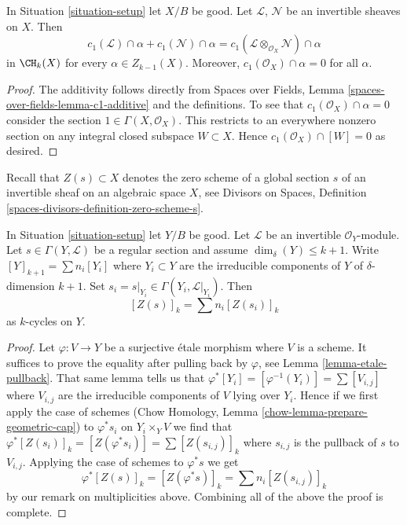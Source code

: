 \begin{lemma}
\label{lemma-c1-cap-additive}
In Situation \ref{situation-setup} let $X/B$ be good.
Let $\mathcal{L}$, $\mathcal{N}$ be an invertible sheaves on $X$.
Then
$$
c_1(\mathcal{L}) \cap \alpha  + c_1(\mathcal{N}) \cap \alpha =
c_1(\mathcal{L} \otimes_{\mathcal{O}_X} \mathcal{N}) \cap \alpha
$$
in $\CH_k(X)$ for every $\alpha \in Z_{k - 1}(X)$. Moreover,
$c_1(\mathcal{O}_X) \cap \alpha = 0$ for all $\alpha$.
\end{lemma}

\begin{proof}
The additivity follows directly from
Spaces over Fields, Lemma \ref{spaces-over-fields-lemma-c1-additive}
and the definitions. To see that $c_1(\mathcal{O}_X) \cap \alpha = 0$
consider the section $1 \in \Gamma(X, \mathcal{O}_X)$. This restricts
to an everywhere nonzero section on any integral closed subspace
$W \subset X$. Hence $c_1(\mathcal{O}_X) \cap [W] = 0$ as desired.
\end{proof}

\noindent
Recall that $Z(s) \subset X$ denotes the zero scheme of a global section
$s$ of an invertible sheaf on an algebraic space $X$, see
Divisors on Spaces, Definition \ref{spaces-divisors-definition-zero-scheme-s}.

\begin{lemma}
\label{lemma-prepare-geometric-cap}
In Situation \ref{situation-setup} let $Y/B$ be good.
Let $\mathcal{L}$ be an invertible $\mathcal{O}_Y$-module.
Let $s \in \Gamma(Y, \mathcal{L})$ be a regular section and
assume $\dim_\delta(Y) \leq k + 1$.
Write $[Y]_{k + 1} = \sum n_i[Y_i]$ where $Y_i \subset Y$ are the
irreducible components of $Y$ of $\delta$-dimension $k + 1$.
Set $s_i = s|_{Y_i} \in \Gamma(Y_i, \mathcal{L}|_{Y_i})$. Then
\begin{equation}
\label{equation-equal-as-cycles}
[Z(s)]_k =  \sum n_i[Z(s_i)]_k
\end{equation}
as $k$-cycles on $Y$.
\end{lemma}

\begin{proof}
Let $\varphi : V \to Y$ be a surjective \'etale morphism where $V$
is a scheme. It suffices to prove the equality after pulling back
by $\varphi$, see Lemma \ref{lemma-etale-pullback}.
That same lemma tells us that
$\varphi^*[Y_i] = [\varphi^{-1}(Y_i)] = \sum [V_{i, j}]$
where $V_{i, j}$ are the irreducible components of $V$ lying over $Y_i$.
Hence if we first apply the case of schemes
(Chow Homology, Lemma \ref{chow-lemma-prepare-geometric-cap}) to
$\varphi^*s_i$ on $Y_i \times_Y V$ we
find that $\varphi^*[Z(s_i)]_k = [Z(\varphi^*s_i)] =
\sum [Z(s_{i, j})]_k$ where $s_{i, j}$ is the pullback
of $s$ to $V_{i, j}$. Applying the case of schemes to $\varphi^*s$ we get
$$
\varphi^*[Z(s)]_k =
[Z(\varphi^*s)]_k =
\sum n_i[Z(s_{i, j})]_k
$$
by our remark on multiplicities above.
Combining all of the above the proof is complete.
\end{proof}

